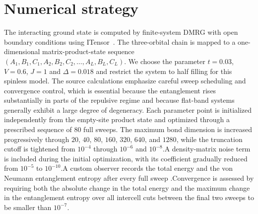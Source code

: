 \documentclass[
  prb,
  reprint,
  superscriptaddress,
  amsmath,
  amssymb,
  longbibliography
]{revtex4-2}
\begin{document}
\section{Numerical strategy}
\label{sec:numerics}

The interacting ground state is computed by finite-system DMRG with open boundary conditions using ITensor~\cite{fishman2022}. The three-orbital chain is mapped to a one-dimensional matrix-product-state sequence $(A_1,B_1,C_1,A_2,B_2,C_2,\dots,A_L,B_L,C_L)$. We choose the parameter $t=0.03$, $V=0.6$, $J=1$ and $\Delta=0.018$ and restrict the system to half filling for this spinless model. The source calculations emphasize careful sweep scheduling and convergence control, which is essential because the entanglement rises substantially in parts of the repulsive regime and because flat-band systems generally exhibit a large degree of degeneracy. Each parameter point
is initialized independently from the empty-site
product state and optimized through a prescribed
sequence of 80 full sweeps. The maximum bond dimension
is increased progressively through
$20$, $40$, $80$, $160$, $320$, $640$, and $1280$,
while the truncation cutoff is tightened from $10^{-4}$
through $10^{-6}$ and $10^{-8}$.A density-matrix noise term is included during the initial optimization, with its coefficient gradually
reduced from $10^{-5}$ to $10^{-10}$.A custom observer records the total energy and the
von Neumann entanglement entropy after every full sweep .Convergence is assessed by requiring both the absolute
change in the total energy and the maximum change in the
entanglement entropy over all intercell cuts between the
final two sweeps to be smaller than $10^{-7}$.
\end{document}

